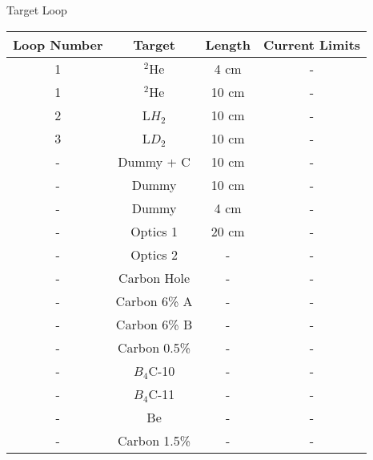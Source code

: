 \begin{Mtable}{Target Loop}
  \centering
  \begin{tabular}{|c|c|c|c|}
    \hline
    \textbf{Loop Number} & \textbf{Target} & \textbf{Length} & \textbf{Current Limits} \\
    \hline
    1 & $^{2}\mathrm{He}$ & 4 cm & - \\
    1 & $^{2}\mathrm{He}$ & 10 cm & - \\
    2 & L$H_2$ & 10 cm & - \\
    3 & L$D_2$ & 10 cm & - \\
    - & Dummy + C & 10 cm & - \\
    - & Dummy & 10 cm  & - \\
    - & Dummy & 4 cm  & - \\
    - & Optics 1 & 20 cm  & - \\
    - & Optics 2 & -  & - \\
    - & Carbon Hole & -  & - \\
    - & Carbon 6\% A & -  & - \\
    - & Carbon 6\% B & -  & - \\
    - & Carbon 0.5\% & -  & - \\
    - & $B_4$C-10 & -  & - \\
    - & $B_4$C-11 & -  & - \\
    - & Be & -  & - \\
    - & Carbon 1.5\% & -  & - \\
    \hline
    \end{tabular}
  \caption{Break down of all targets available during the running period. The three cryogenic targets are labeled alongside their corresponding loops. The target length is also provided for each type.}
  \label{tab:2-3_target_loop}
\end{Mtable}

